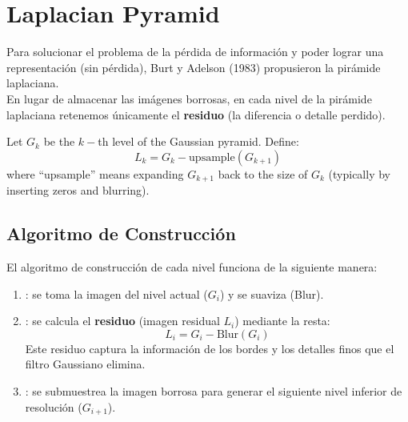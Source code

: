 \section{Laplacian Pyramid}
Para solucionar el problema de la pérdida de información y poder lograr una representación  (sin pérdida), Burt y Adelson (1983) propusieron la pirámide laplaciana. \\

\noindent
En lugar de almacenar las imágenes borrosas, en cada nivel de la pirámide laplaciana retenemos únicamente el \textbf{residuo} (la diferencia o detalle perdido). 

\begin{notacion}
    Let $G_k$ be the $k-$th level of the Gaussian pyramid. Define:
    \begin{equation*}
        L_k = G_k - \text{upsample}(G_{k+1})
    \end{equation*}
    where ``upsample'' means expanding $G_{k+1}$ back to the size of $G_k$ (typically by inserting zeros and blurring).
\end{notacion}

\subsection{Algoritmo de Construcción}
\noindent
El algoritmo de construcción de cada nivel funciona de la siguiente manera:
\begin{enumerate}
    \item {}: se toma la imagen del nivel actual ($G_i$) y se suaviza (Blur).
    \item {}: se calcula el \textbf{residuo} (imagen residual $L_i$) mediante la resta:
    $$L_i = G_i - \text{Blur}(G_i)$$
    Este residuo captura la información de los bordes y los detalles finos que el filtro Gaussiano elimina.
    \item {}: se submuestrea la imagen borrosa para generar el siguiente nivel inferior de resolución ($G_{i+1}$).
\end{enumerate}


